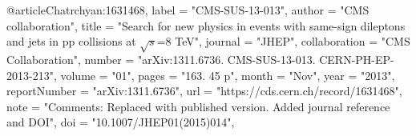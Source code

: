 @article{Chatrchyan:1631468,
      label          = "CMS-SUS-13-013",
      author        = "{CMS collaboration}",
      title         = "{Search for new physics in events with same-sign dileptons
                       and jets in pp collisions at $\sqrt{s}$=8 TeV}",
      journal       = "JHEP",
      collaboration = "CMS Collaboration",
      number        = "arXiv:1311.6736. CMS-SUS-13-013. CERN-PH-EP-2013-213",
      volume        = "01",
      pages         = "163. 45 p",
      month         = "Nov",
      year          = "2013",
      reportNumber  = "arXiv:1311.6736",
      url           = "https://cds.cern.ch/record/1631468",
      note          = "Comments: Replaced with published version. Added journal
                       reference and DOI",
      doi           = "10.1007/JHEP01(2015)014",
}

